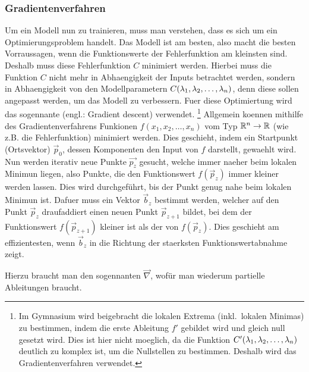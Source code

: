 \documentclass[../main]{subfiles}
\begin{document}
\subsubsection{Gradientenverfahren}
Um ein Modell nun zu trainieren, muss man verstehen, dass es sich um ein Optimierungsproblem handelt.
Das Modell ist am besten, also macht die besten Vorraussagen, wenn die
Funktionswerte der Fehlerfunktion am kleinsten sind.
Deshalb muss diese Fehlerfunktion $C$ minimiert werden.
Hierbei muss die Funktion $C$ nicht mehr in Abhaengigkeit der Inputs betrachtet werden, sondern in Abhaengigkeit von den Modellparametern
$C(\lambda_1, \lambda_2, \ldots, \lambda_n)$, denn diese sollen angepasst werden, um das Modell zu verbessern.
Fuer diese Optimiertung wird das sogennante  (engl.: Gradient descent) verwendet.
\footnote{
  Im Gymnasium wird beigebracht die lokalen Extrema (inkl.\ lokalen Minimas) zu bestimmen, indem die erste Ableitung $f'$ gebildet wird und  gleich null gesetzt wird.
  Dies ist hier nicht moeglich, da die Funktion $C'(\lambda_1,\lambda_2, \ldots, \lambda_n)$ deutlich zu komplex ist, um die Nullstellen zu bestimmen. Deshalb wird das Gradientenverfahren verwendet.
}
\para{}
Allgemein koennen mithilfe des Gradientenverfahrens Funkionen $f(x_1, x_2, \ldots, x_n)$ vom Typ $\mathbb{R}^n \to \mathbb{R}$ (wie z.B. die Fehlerfunktion) minimiert werden.
Dies geschieht, indem ein Startpunkt (Ortsvektor) $\vec{p}_0$, dessen Komponenten den Input von $f$ darstellt, gewaehlt wird.
Nun werden iterativ neue Punkte $\vec{p_z}$ gesucht, welche immer naeher beim lokalen Minimun liegen, also Punkte, die den Funktionswert $f(\vec{p}_z)$ immer kleiner werden lassen.
Dies wird durchgeführt, bis der Punkt genug nahe beim lokalen Minimun ist.
\para{}
Dafuer muss ein Vektor $\vec{b}_z$ bestimmt werden, welcher auf den Punkt $\vec{p}_z$ draufaddiert einen neuen Punkt $\vec{p}_{z+1}$ bildet,
bei dem der Funktionswert $f(\vec{p}_{z+1})$ kleiner ist als der von $f(\vec{p}_z)$.
Dies geschieht am effizientesten, wenn $\vec{b}_z$ in die Richtung der staerksten Funktionswertabnahme zeigt.

Hierzu braucht man den sogennanten  $\vec{\nabla}$, wofür man wiederum partielle Ableitungen braucht.
\para{}
\end{document}
